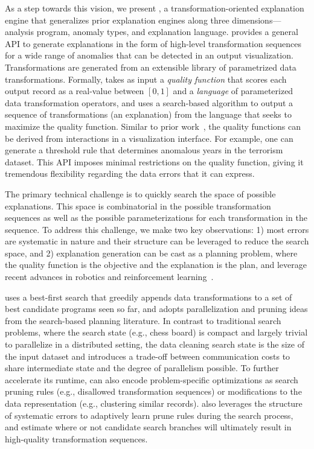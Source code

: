 As a step towards this vision,  we present \sys, a transformation-oriented explanation engine that generalizes prior explanation engines along three dimensions---analysis program, anomaly types, and explanation language. 
\sys  provides a general API to generate explanations in the form of high-level transformation sequences for a wide range of anomalies that can be detected in an output visualization. Transformations are generated from an extensible library of parametrized data transformations.
Formally, \sys takes as input a {\it quality function} that scores each output record as a real-value between $[0,1]$ and a {\it language} of parameterized data transformation operators, and uses a search-based algorithm to output a sequence of transformations (an explanation) from the language that seeks to maximize the quality function.  Similar to prior work~\cite{scorpion}, the quality functions can be derived from interactions in a visualization interface. For example, one can generate a threshold rule that determines anomalous years in the terrorism dataset.  This API imposes minimal restrictions on the quality function, giving it tremendous flexibility regarding the data errors that it can express.   

The primary technical challenge is to quickly search the space of possible explanations.  This space is combinatorial in the possible transformation sequences as well as the possible parameterizations for each transformation in the sequence.  
To address this challenge, we make two key observations: 1) most errors are systematic in nature and their structure can be leveraged to reduce the search space, and 2) explanation generation can be cast as a planning problem, where the quality function is the objective and the explanation is the plan,  and leverage recent advances in robotics and reinforcement learning~\cite{dpm}.


\sys uses a best-first search that greedily appends data transformations to a set of best candidate programs seen so far, and adopts parallelization and pruning ideas from the search-based planning literature.  
In contrast to traditional search problems, where the search state (e.g., chess board) is compact and largely trivial to parallelize in a distributed setting, the data cleaning search state is the size of the input dataset and introduces a trade-off between communication costs to share intermediate state and the degree of parallelism possible.  
 To further accelerate its runtime, \sys can also encode problem-specific optimizations as search pruning rules (e.g., disallowed transformation sequences) or modifications to the data representation (e.g., clustering similar records).  
\sys also leverages the structure of systematic errors to adaptively learn prune rules during the search process, and estimate where or not candidate search branches will ultimately result in high-quality transformation sequences.  
 
